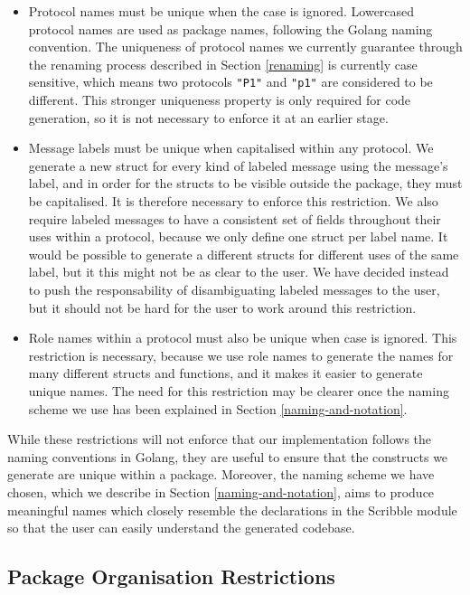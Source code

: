 \documentclass[12pt,twoside]{report}
\begin{document}
\begin{itemize}
    \item Protocol names must be unique when the case is ignored. Lowercased protocol names are used as package names, following the Golang naming convention. The uniqueness of protocol names we currently guarantee through the renaming process described in Section \ref{renaming} is currently case sensitive, which means two protocols \texttt{"P1"} and \texttt{"p1"} are considered to be different. This stronger uniqueness property is only required for code generation, so it is not necessary to enforce it at an earlier stage.
    \item Message labels must be unique when capitalised within any protocol. We generate a new struct for every kind of labeled message using the message's label, and in order for the structs to be visible outside the package, they must be capitalised. It is therefore necessary to enforce this restriction. We also require labeled messages to have a consistent set of fields throughout their uses within a protocol, because we only define one struct per label name. It would be possible to generate a different structs for different uses of the same label, but it this might not be as clear to the user. We have decided instead to push the responsability of disambiguating labeled messages to the user, but it should not be hard for the user to work around this restriction.
    \item Role names within a protocol must also be unique when case is ignored. This restriction is necessary, because we use role names to generate the names for many different structs and functions, and it makes it easier to generate unique names. The need for this restriction may be clearer once the naming scheme we use has been explained in Section \ref{naming-and-notation}.
\end{itemize}

While these restrictions will not enforce that our implementation follows the naming conventions in Golang, they are useful to ensure that the constructs we generate are unique within a package. Moreover, the naming scheme we have chosen, which we describe in Section \ref{naming-and-notation}, aims to produce meaningful names which closely resemble the declarations in the Scribble module so that the user can easily understand the generated codebase.

\subsection{Package Organisation Restrictions}
\end{document}
